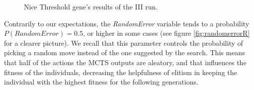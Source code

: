 \begin{figure}[ht!]
    \quad
	\quad
  \captionsetup{justification=centering}
    \caption{Nice Threshold gene's results of the III run.}
    \label{fig:nicethresR}
\end{figure}
Contrarily to our expectations, the \emph{RandomError} variable tends to a probability $P(RandomError)=0.5$, or higher in some cases (see figure \ref{fig:randomerrorR} for a clearer picture). We recall that this parameter controls the probability of picking a random move instead of the one suggested by the search. This means that half of the actions the MCTS outputs are aleatory, and that influences the fitness of the individuals, decreasing the helpfulness of elitism in keeping the individual with the highest fitness for the following generations.
